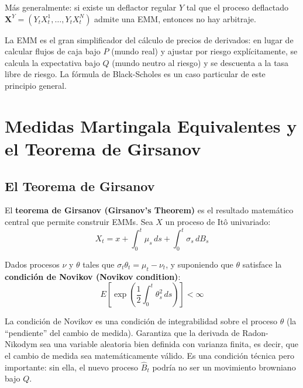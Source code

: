 \documentclass[12pt]{article}
\begin{document}
M\'as generalmente: si existe un deflactor regular $Y$ tal que el proceso deflactado $\mathbf{X}^Y = (Y_t X_t^1, \ldots, Y_t X_t^N)$ admite una EMM, entonces no hay arbitraje.

\begin{intuicion}
La EMM es el gran simplificador del c\'alculo de precios de derivados: en lugar de calcular flujos de caja bajo $P$ (mundo real) y ajustar por riesgo expl\'icitamente, se calcula la expectativa bajo $Q$ (mundo neutro al riesgo) y se descuenta a la tasa libre de riesgo. La f\'ormula de Black-Scholes es un caso particular de este principio general.
\end{intuicion}

\section{Medidas Martingala Equivalentes y el Teorema de Girsanov}

\subsection{El Teorema de Girsanov}

El \textbf{teorema de Girsanov (Girsanov's Theorem)} es el resultado matem\'atico central que permite construir EMMs. Sea $X$ un proceso de It\^o univariado:
\begin{equation}
  X_t = x + \int_0^t \mu_s \, ds + \int_0^t \sigma_s \, dB_s
\end{equation}

Dados procesos $\nu$ y $\theta$ tales que $\sigma_t \theta_t = \mu_t - \nu_t$, y suponiendo que $\theta$ satisface la \textbf{condici\'on de Novikov (Novikov condition)}:
\begin{equation}
  E\!\left[\exp\!\left(\frac{1}{2}\int_0^t \theta_s^2 \, ds\right)\right] < \infty
\end{equation}

\begin{intuicionmat}
La condici\'on de Novikov es una condici\'on de integrabilidad sobre el proceso $\theta$ (la ``pendiente'' del cambio de medida). Garantiza que la derivada de Radon-Nikodym sea una variable aleatoria bien definida con varianza finita, es decir, que el cambio de medida sea matem\'aticamente v\'alido. Es una condici\'on t\'ecnica pero importante: sin ella, el nuevo proceso $\hat{B}_t$ podr\'ia no ser un movimiento browniano bajo $Q$.
\end{intuicionmat}
\end{document}
